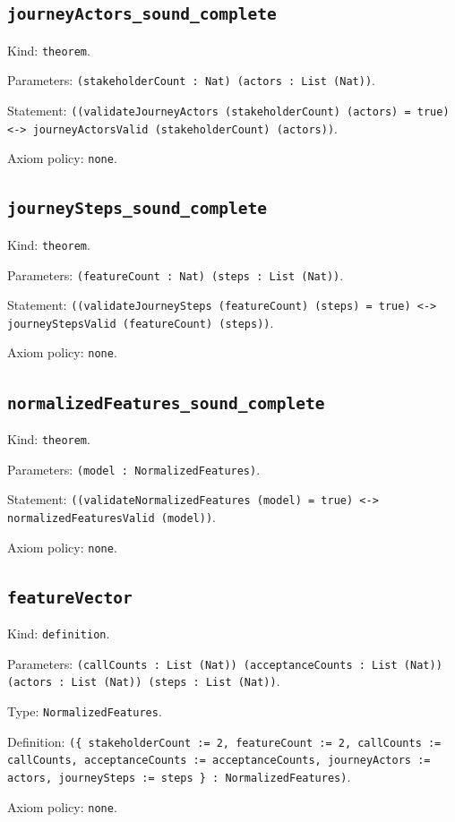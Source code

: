 \documentclass[11pt]{article}
\begin{document}
\subsection*{\texttt{journeyActors\_sound\_complete}}
\noindent Kind: \texttt{theorem}.\par
\noindent Parameters: \texttt{(stakeholderCount : Nat) (actors : List (Nat))}.\par
\noindent Statement: \texttt{((validateJourneyActors (stakeholderCount) (actors) = true) <-> journeyActorsValid (stakeholderCount) (actors))}.\par
\noindent Axiom policy: \texttt{none}.\par
\subsection*{\texttt{journeySteps\_sound\_complete}}
\noindent Kind: \texttt{theorem}.\par
\noindent Parameters: \texttt{(featureCount : Nat) (steps : List (Nat))}.\par
\noindent Statement: \texttt{((validateJourneySteps (featureCount) (steps) = true) <-> journeyStepsValid (featureCount) (steps))}.\par
\noindent Axiom policy: \texttt{none}.\par
\subsection*{\texttt{normalizedFeatures\_sound\_complete}}
\noindent Kind: \texttt{theorem}.\par
\noindent Parameters: \texttt{(model : NormalizedFeatures)}.\par
\noindent Statement: \texttt{((validateNormalizedFeatures (model) = true) <-> normalizedFeaturesValid (model))}.\par
\noindent Axiom policy: \texttt{none}.\par
\subsection*{\texttt{featureVector}}
\noindent Kind: \texttt{definition}.\par
\noindent Parameters: \texttt{(callCounts : List (Nat)) (acceptanceCounts : List (Nat)) (actors : List (Nat)) (steps : List (Nat))}.\par
\noindent Type: \texttt{NormalizedFeatures}.\par
\noindent Definition: \texttt{(\{ stakeholderCount := 2, featureCount := 2, callCounts := callCounts, acceptanceCounts := acceptanceCounts, journeyActors := actors, journeySteps := steps \} : NormalizedFeatures)}.\par
\noindent Axiom policy: \texttt{none}.\par
\end{document}
